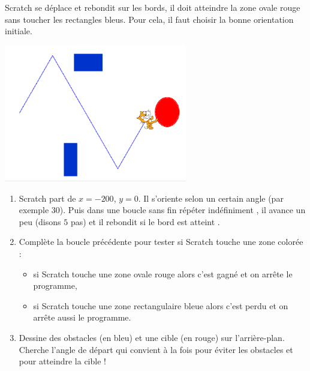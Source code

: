 \documentclass[class=report,crop=false, 12pt]{standalone}
\begin{document}




\bigskip
\bigskip

\begin{activite}

Scratch se déplace et rebondit sur les bords, il doit atteindre la zone ovale rouge sans toucher les rectangles bleus. Pour cela, il faut choisir la bonne orientation initiale.

\begin{center}
  \includegraphics[width=0.6\textwidth]{ecran-04-ex1} 
\end{center}

\begin{enumerate}
  \item Scratch part de $x=-200$, $y=0$. Il s'oriente selon un certain angle (par exemple $30$\textdegree). Puis dans une boucle sans fin \og répéter indéfiniment \fg{}, il avance un peu (disons $5$ pas) et il \og rebondit si le bord est atteint \fg{}.
  
  
  \item Complète la boucle précédente pour tester si Scratch touche une zone colorée :
  \begin{itemize}
    \item si Scratch touche une zone ovale rouge alors c'est gagné et on arrête le programme,
    
    \item si Scratch touche une zone rectangulaire bleue alors c'est perdu et on arrête aussi le programme.
  \end{itemize}
   
  \item Dessine des obstacles (en bleu) et une cible (en rouge) sur l'arrière-plan. Cherche l'angle de départ qui convient à la fois pour éviter les obstacles et pour atteindre la cible !
\end{enumerate}




\end{activite}
\end{document}
